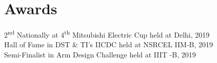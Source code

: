 \documentclass[]{deedy-resume-openfont}
\begin{document}
\begin{minipage}[t]{0.32\textwidth}
\sectionsep
\section{Awards}
\small{
\textbullet{} 2\textsuperscript{nd} Nationally at 4\textsuperscript{th} Mitsubishi Electric Cup held at Delhi, 2019\\
\vspace{1mm}
\textbullet{} Hall of Fame in DST \& TI’s IICDC held at NSRCEL IIM-B, 2019\\
\vspace{1mm}
\textbullet{} Semi-Finalist in Arm Design Challenge held at IIIT -B, 2019\\
}

%
%

\end{minipage} 
\hfill
\end{document}
